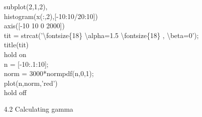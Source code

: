 \documentclass[twoside,twocolumn]{article}
\begin{document}
\begin{itshape}
subplot(2,1,2),\\
histogram(x(:,2),[-10:10/20:10])\\
axis([-10 10 0 2000])\\
tit = strcat('\textbackslash fontsize\{18\} \textbackslash alpha=1.5 \textbackslash fontsize\{18\} , \textbackslash beta=0');\\
title(tit)\\
hold on\\
n = [-10:.1:10];\\
norm = 3000*normpdf(n,0,1);\\
plot(n,norm,'red')\\
hold off\\
\end{itshape}



\begin{large}
4.2 Calculating gamma
\end{large}
\newline
\end{document}
